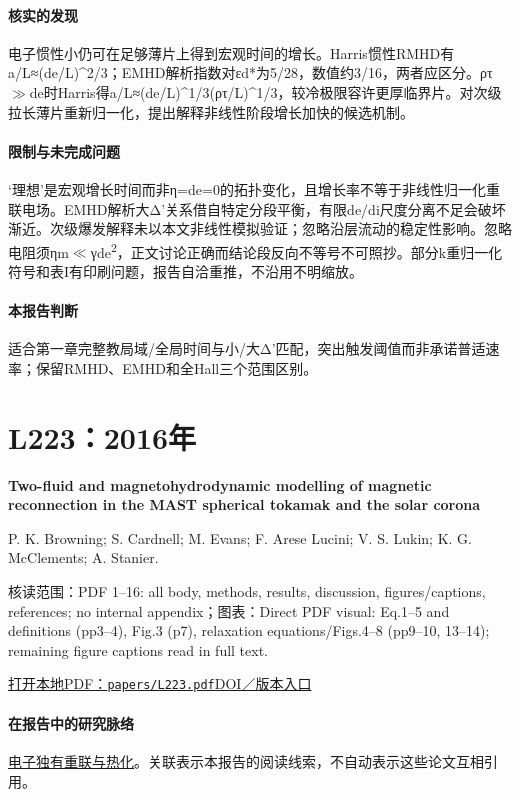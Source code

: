 \paragraph{核实的发现}电子惯性小仍可在足够薄片上得到宏观时间的增长。Harris惯性RMHD有a/L≈(de/L)\textasciicircum{}2/3；EMHD解析指数对εd*为5/28，数值约3/16，两者应区分。ρτ\ensuremath{\gg}de时Harris得a/L≈(de/L)\textasciicircum{}1/3(ρτ/L)\textasciicircum{}1/3，较冷极限容许更厚临界片。对次级拉长薄片重新归一化，提出解释非线性阶段增长加快的候选机制。

\paragraph{限制与未完成问题}‘理想’是宏观增长时间而非η=de=0的拓扑变化，且增长率不等于非线性归一化重联电场。EMHD解析大Δ'关系借自特定分段平衡，有限de/di尺度分离不足会破坏渐近。次级爆发解释未以本文非线性模拟验证；忽略沿层流动的稳定性影响。忽略电阻须ηm\ensuremath{\ll}γde\textsuperscript{2}，正文讨论正确而结论段反向不等号不可照抄。部分k重归一化符号和表I有印刷问题，报告自洽重推，不沿用不明缩放。

\paragraph{本报告判断}适合第一章完整教局域/全局时间与小/大Δ'匹配，突出触发阈值而非承诺普适速率；保留RMHD、EMHD和全Hall三个范围区别。

\section{L223：2016年}\label{paper:L223}

\textbf{Two-fluid and magnetohydrodynamic modelling of magnetic reconnection in the MAST spherical tokamak and the solar corona}\citep{L223}\

P. K. Browning;  S. Cardnell;  M. Evans;  F. Arese Lucini;  V. S. Lukin;  K. G. McClements;  A. Stanier.

\textsf{核读范围：}PDF 1–16: all body,  methods,  results,  discussion,  figures/captions,  references;  no internal appendix；\textsf{图表：}Direct PDF visual: Eq.1–5 and definitions (pp3–4),  Fig.3 (p7),  relaxation equations/Figs.4–8 (pp9–10, 13–14);  remaining figure captions read in full text.

\href{run:papers/L223.pdf}{打开本地PDF：\texttt{papers/L223.pdf}}\quad\href{https://doi.org/10.1088/0741-3335/58/1/014041}{DOI／版本入口}

\paragraph{在报告中的研究脉络}\hyperref[story:energy]{电子独有重联与热化}。关联表示本报告的阅读线索，不自动表示这些论文互相引用。

